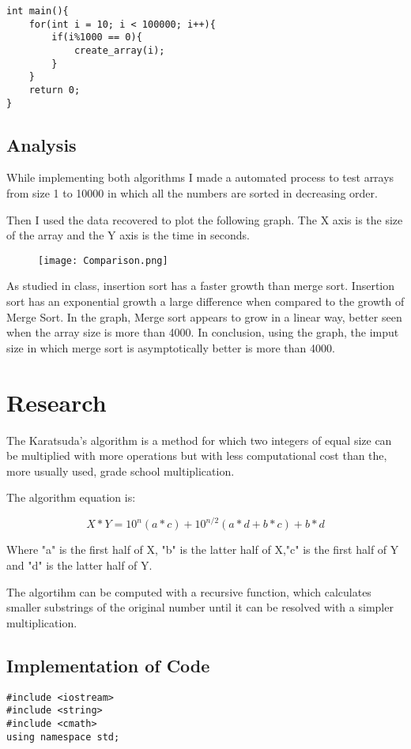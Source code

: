 \documentclass[12pt]{article}
\begin{document}
{{{{\begin{lstlisting}
int main(){
	for(int i = 10; i < 100000; i++){
		if(i%1000 == 0){
			create_array(i);
		}
	}
	return 0;
}
	\end{lstlisting}	
}
\subsection{Analysis}{
	While implementing both algorithms I made a automated process to test arrays from size 1 to 10000 in which all the numbers are sorted in decreasing order.
	
	Then I used the data recovered to plot the following graph. The X axis is the size of the array and the Y axis is the time in seconds.
\begin{figure}[h]
	\texttt{[image: Comparison.png]}
\end{figure}
	As studied in class, insertion sort has a faster growth than merge sort. Insertion sort has an exponential growth a large difference when compared to the growth of Merge Sort. In the graph, Merge sort appears to grow in a linear way, better seen when the array size is more than 4000. In conclusion, using the graph, the imput size in which merge sort is asymptotically better is more than 4000.
}
}
\section{Research}{
	The Karatsuda's algorithm is a method for which two integers of equal size can be multiplied with more operations but with less computational cost than the, more usually used, grade school multiplication.
	
	The algorithm equation is:
	
	\begin{equation*}
		X * Y = 10^n(a*c)+10^{n/2}(a*d+b*c)+b*d
	\end{equation*}
	
	Where "a" is the first half of X, "b" is the latter half of X,"c" is the first half of Y and "d" is the latter half of Y.
	
	The algortihm can be computed with a recursive function, which calculates smaller substrings of the original number until it can be resolved with a simpler multiplication.
	
	\subsection{Implementation of Code}
		
\begin{lstlisting}
#include <iostream>
#include <string>
#include <cmath>
using namespace std;
		

\end{lstlisting}}}}
\end{document}
